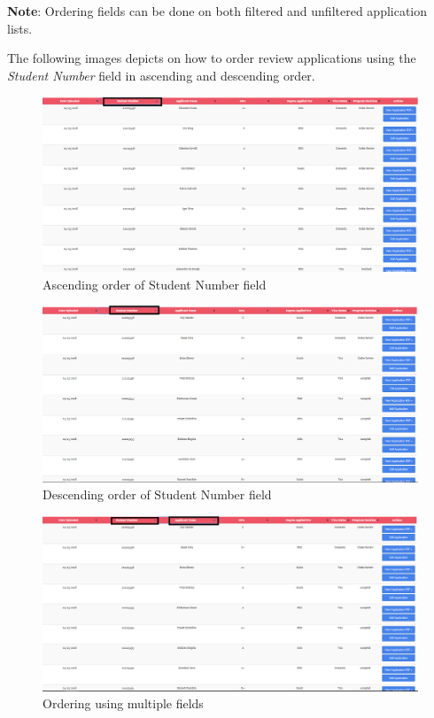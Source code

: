 \documentclass[fontsize=12pt,paper=letter,twoside]{scrartcl}
\begin{document}
\bigskip
\noindent \textbf{Note}: Ordering fields can be done on both filtered and unfiltered application lists.

\bigskip
\noindent The following images depicts on how to order review applications using the \emph{Student Number} field in ascending and descending order.

\begin{figure}[!htb]
\begin{center}
\includegraphics[width=.8\textwidth]{images/adm/ma/order_ascending.png}
\end{center}
\caption{Ascending order of Student Number field}
\label{fig:adm/order_ascending}
\end{figure}

\begin{figure}[!htb]
\begin{center}
\includegraphics[width=.99\textwidth]{images/adm/ma/order_descending.png}
\end{center}
\caption{Descending order of Student Number field}
\label{fig:adm/order_descending}
\end{figure}

\begin{figure}[!htb]
\begin{center}
\includegraphics[width=.99\textwidth]{images/adm/ma/multiple_order.png}
\end{center}
\caption{Ordering using multiple fields}
\label{fig:adm/multiple_order}
\end{figure}
\end{document}
